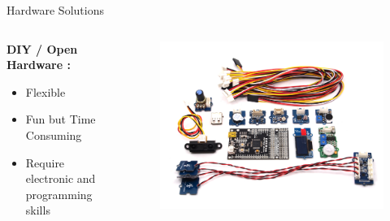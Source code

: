 \documentclass{beamer}
\begin{document}
\begin{frame}{Hardware Solutions}
\begin{columns}
\begin{column}[l]{0.5\textwidth}
\textbf{DIY / Open Hardware :}
\begin{itemize}
\item[\Large\smiley]Flexible
\item[\Large\smiley]Fun but Time Consuming
\item[\Large\frownie] Require electronic and programming skills
\end{itemize}
\end{column}
\begin{column}[r]{0.5\textwidth}
\begin{figure}
\includegraphics[width=\columnwidth]{figures/kit.jpg}
\end{figure}
\end{column}
\end{columns}
\end{frame}
\end{document}
